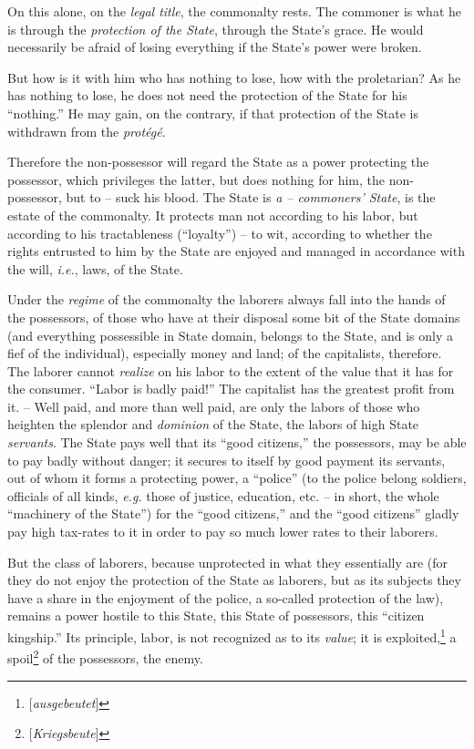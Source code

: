 On this alone, on the \textit{legal title}, the commonalty rests. The commoner 
is what he is through the \textit{protection of the State}, through the 
State's grace. He would necessarily be afraid of losing everything if the 
State's power were broken.

But how is it with him who has nothing to lose, how with the proletarian? As 
he has nothing to lose, he does not need the protection of the State for his 
``nothing.'' He may gain, on the contrary, if that protection of the State 
is withdrawn from the \textit{prot\'eg\'e}.

Therefore the non-possessor will regard the State as a power protecting the 
possessor, which privileges the latter, but does nothing for him, the 
non-possessor, but to -- suck his blood. The State is \textit{a -- commoners' 
State}, is the estate of the commonalty. It protects man not according to his 
labor, but according to his tractableness (``loyalty'') -- to wit, according 
to whether the rights entrusted to him by the State are enjoyed and managed in 
accordance with the will, \textit{i.e.}, laws, of the State.

Under the \textit{regime} of the commonalty the laborers always fall into the 
hands of the possessors, of those who have at their disposal some bit of the 
State domains (and everything possessible in State domain, belongs to the 
State, and is only a fief of the individual), especially money and land; of 
the capitalists, therefore. The laborer cannot \textit{realize} on his labor 
to the extent of the value that it has for the consumer. ``Labor is badly 
paid!'' The capitalist has the greatest profit from it. -- Well paid, and 
more than well paid, are only the labors of those who heighten the splendor 
and \textit{dominion} of the State, the labors of high State 
\textit{servants}. The State pays well that its ``good citizens,'' the 
possessors, may be able to pay badly without danger; it secures to itself by 
good payment its servants, out of whom it forms a protecting power, a 
``police'' (to the police belong soldiers, officials of all kinds, 
\textit{e.g.} those of justice, education, etc. -- in short, the whole 
``machinery of the State'') for the ``good citizens,'' and the ``good 
citizens'' gladly pay high tax-rates to it in order to pay so much lower 
rates to their laborers.

But the class of laborers, because unprotected in what they essentially are 
(for they do not enjoy the protection of the State as laborers, but as its 
subjects they have a share in the enjoyment of the police, a so-called 
protection of the law), remains a power hostile to this State, this State of 
possessors, this ``citizen kingship.'' Its principle, labor, is not 
recognized as to its \textit{value}; it is 
exploited,\footnote{[\textit{ausgebeutet}]} a 
spoil\footnote{[\textit{Kriegsbeute}]} of the possessors, the enemy.


